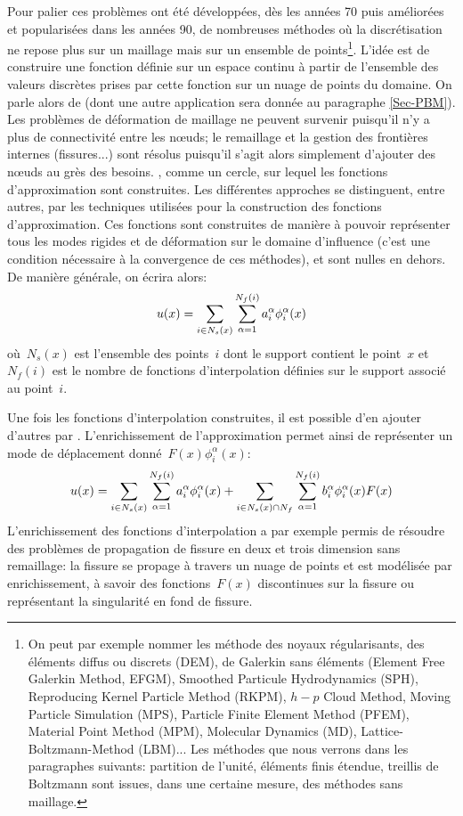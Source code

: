 \medskip
Pour palier ces problèmes ont été développées, dès les années 70 puis améliorées et popularisées dans les années 90, de nombreuses méthodes où la discrétisation ne repose plus sur un maillage mais sur un ensemble de points\footnote{On peut par exemple nommer les méthode des noyaux régularisants, des éléments diffus ou discrets (DEM), de Galerkin sans éléments (Element Free Galerkin Method, EFGM), Smoothed Particule Hydrodynamics (SPH), Reproducing Kernel Particle Method (RKPM), $h-p$ Cloud Method, Moving Particle Simulation (MPS), Particle Finite Element Method (PFEM), Material Point Method (MPM), Molecular Dynamics (MD), Lattice-Boltzmann-Method (LBM)... Les méthodes que nous verrons dans les paragraphes suivants: partition de l'unité, éléments finis étendue, treillis de Boltzmann sont issues, dans une certaine mesure, des méthodes sans maillage.}.
L'idée est de construire une fonction définie sur un espace continu à partir de l'ensemble des valeurs discrètes prises par cette fonction sur un nuage de points du domaine. On parle alors de  (dont une autre application sera donnée au paragraphe \ref{Sec-PBM}). Les problèmes de déformation de maillage ne peuvent survenir puisqu'il n'y a plus de connectivité entre les nœuds; le remaillage et la gestion des frontières internes (fissures...) sont résolus puisqu'il s'agit alors simplement d'ajouter des nœuds au grès des besoins.
, comme un cercle, sur lequel les fonctions d'approximation sont construites. Les différentes approches se distinguent, entre autres, par les techniques utilisées pour la construction des fonctions d'approximation. Ces fonctions sont construites de manière à pouvoir représenter tous les modes rigides et de déformation sur le domaine d'influence (c'est une condition nécessaire à la convergence de ces méthodes), et sont nulles en dehors. De manière générale, on écrira alors:
\begin{equation}\label{Eq-meshless}
u(x) = \displaystyle\sum_{i\in N_s(x)}\displaystyle\sum_{\alpha=1}^{N_f(i)} a_i^\alpha \phi_i^\alpha(x)
\end{equation}
où~$N_s(x)$ est l'ensemble des points~$i$ dont le support contient le point~$x$ et~$N_f (i)$ est le nombre de fonctions d'interpolation définies sur le support associé au point~$i$.

\medskip
Une fois les fonctions d'interpolation construites, il est possible d'en ajouter d'autres par . L'enrichissement de l'approximation permet ainsi de représenter un mode de déplacement donné~$F(x)\phi_i^\alpha(x)$:
\begin{equation}
u(x) = \displaystyle\sum_{i\in N_s(x)}\displaystyle\sum_{\alpha=1}^{N_f(i)} a_i^\alpha \phi_i^\alpha(x) + \displaystyle\sum_{i\in N_s(x)\cap N_f}\displaystyle\sum_{\alpha=1}^{N_f(i)} b_i^\alpha\phi_i^\alpha(x)F(x)
\end{equation}
L'enrichissement des fonctions d'interpolation a par exemple permis de résoudre des problèmes de propagation de fissure en deux et trois dimension sans remaillage: la fissure se propage à travers un nuage de points et est modélisée par enrichissement, à savoir des fonctions~$F(x)$ discontinues sur la fissure ou représentant la singularité en fond de fissure.

